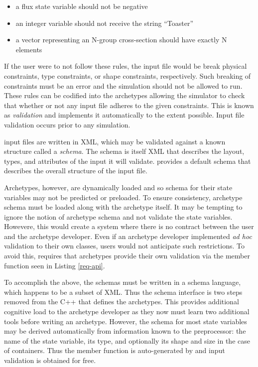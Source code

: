 \begin{itemize}
    \item a flux state variable should not be negative
    \item an integer variable should not receive the string ``Toaster''
    \item a vector representing an N-group cross-section should have exactly N
          elements
\end{itemize}
If the user were to not follow these rules, the input file would be break physical
constraints, type constraints, or shape constraints, respectively.
Such breaking of constraints must be an error and the simulation should not be
allowed to run.
These rules can be codified into the archetypes allowing
the simulator to check that whether or not any input file adheres to the
given constraints. This is known as \emph{validation} and \cyclus implements
it automatically to the extent possible. Input file validation occurs prior
to any simulation.


\Cyclus input files are written in \gls{XML}, which  may be validated against a
known structure called a \emph{schema}. The schema is itself \gls{XML} that describes
the layout, types, and attributes of the input it will validate.
\Cyclus provides a default schema that describes the overall structure of the
input file.

Archetypes, however, are dynamically loaded and so schema for their state
variables may not be predicted or preloaded. To ensure consistency, archetype schema
must be loaded along with the archetype itself.  It may be tempting to ignore the
notion of archetype schema and not validate the state variables.
Howevere, this would
create a system where there is no contract between the
user and the archetype developer. Even if an archetype developer implemented
\emph{ad hoc} validation to their own classes, users would not
anticipate such
restrictions.  To avoid this, \cyclus requires
that archetypes provide their own validation via the  member
function seen in Listing \ref{req-api}.

To accomplish the
above, the schemas must be written in a schema language, which happens to be a
subset of \gls{XML}. Thus the schema interface is two steps removed from the C++ that
defines the archetypes.
This provides additional
cognitive load to the archetype developer as they now must learn two additional
tools before writing an archetype. However, the schema for most state
variables may be derived automatically from information known to the preprocessor:
the name of the state variable, its type, and optionally its shape and size in
the case of containers. Thus the  member function is auto-generated
by \cycpp and input validation is obtained for free.

